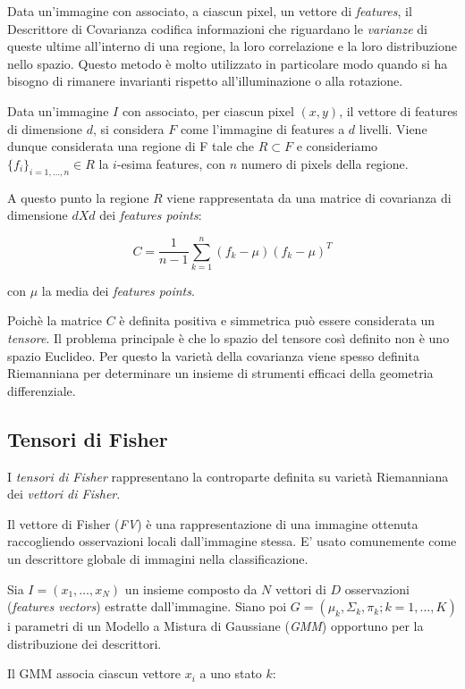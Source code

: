 Data un'immagine con associato, a ciascun pixel, un vettore di \emph{features}, il Descrittore di Covarianza codifica informazioni che riguardano le \emph{varianze} di queste ultime all'interno di una regione, la loro correlazione e la loro distribuzione nello spazio. Questo metodo è molto utilizzato in particolare modo quando si ha bisogno di rimanere invarianti rispetto all'illuminazione o alla rotazione.

Data un'immagine $I$ con associato, per ciascun pixel $(x, y)$, il vettore di features di dimensione $d$, si considera $F$ come l'immagine di features a $d$ livelli. Viene dunque considerata una regione di F tale che $R \subset F$ e consideriamo $\{f_i\}_{i = 1,\ldots, n} \in R$ la $i$-esima features, con $n$ numero di pixels della regione.

A questo punto la regione $R$ viene rappresentata da una matrice di covarianza di dimensione $d X d$ dei \emph{features points}:

$$C = \frac{1}{n -1} \sum_{k = 1}^{n} (f_k - \mu)(f_k - \mu)^T$$

con $\mu$ la media dei \emph{features points}.

Poichè la matrice $C$ è definita positiva e simmetrica può essere considerata un \emph{tensore}. Il problema principale è che lo spazio del tensore così definito non è uno spazio Euclideo. Per questo la varietà della covarianza viene spesso definita Riemanniana per determinare un insieme di strumenti efficaci della geometria differenziale.

\subsection{Tensori di Fisher}

I \emph{tensori di Fisher} rappresentano la controparte definita su varietà Riemanniana dei \emph{vettori di Fisher}.

Il vettore di Fisher (\emph{FV}) è una rappresentazione di una immagine ottenuta raccogliendo osservazioni locali dall'immagine stessa. E' usato comunemente come un descrittore globale di immagini nella classificazione.

Sia $I = (x_1, \ldots, x_N)$ un insieme composto da $N$ vettori di $D$ osservazioni (\emph{features vectors}) estratte dall'immagine. Siano poi $G = (\mu_k, \Sigma_k, \pi_k; k = 1, \ldots, K)$ i parametri di un Modello a Mistura di Gaussiane (\emph{GMM}) opportuno per la distribuzione dei descrittori.

Il GMM associa ciascun vettore $x_i$ a uno stato $k$:

